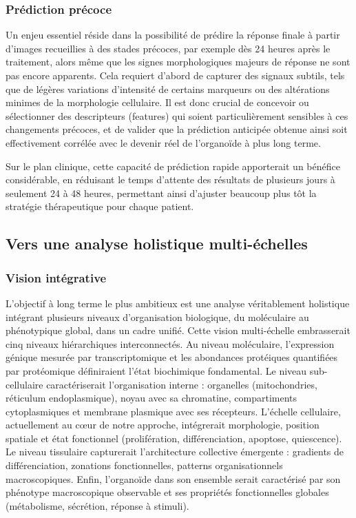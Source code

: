 \subsubsection{Prédiction précoce}

Un enjeu essentiel réside dans la possibilité de prédire la réponse finale à partir d’images recueillies à des stades précoces, par exemple dès 24 heures après le traitement, alors même que les signes morphologiques majeurs de réponse ne sont pas encore apparents. Cela requiert d’abord de capturer des signaux subtils, tels que de légères variations d’intensité de certains marqueurs ou des altérations minimes de la morphologie cellulaire. Il est donc crucial de concevoir ou sélectionner des descripteurs (features) qui soient particulièrement sensibles à ces changements précoces, et de valider que la prédiction anticipée obtenue ainsi soit effectivement corrélée avec le devenir réel de l’organoïde à plus long terme.

Sur le plan clinique, cette capacité de prédiction rapide apporterait un bénéfice considérable, en réduisant le temps d’attente des résultats de plusieurs jours à seulement 24 à 48 heures, permettant ainsi d’ajuster beaucoup plus tôt la stratégie thérapeutique pour chaque patient.


\subsection{Vers une analyse holistique multi-échelles}

\subsubsection{Vision intégrative}

L'objectif à long terme le plus ambitieux est une analyse véritablement holistique intégrant plusieurs niveaux d'organisation biologique, du moléculaire au phénotypique global, dans un cadre unifié. Cette vision multi-échelle embrasserait cinq niveaux hiérarchiques interconnectés. Au niveau moléculaire, l'expression génique mesurée par transcriptomique et les abondances protéiques quantifiées par protéomique définiraient l'état biochimique fondamental. Le niveau sub-cellulaire caractériserait l'organisation interne : organelles (mitochondries, réticulum endoplasmique), noyau avec sa chromatine, compartiments cytoplasmiques et membrane plasmique avec ses récepteurs. L'échelle cellulaire, actuellement au cœur de notre approche, intégrerait morphologie, position spatiale et état fonctionnel (prolifération, différenciation, apoptose, quiescence). Le niveau tissulaire capturerait l'architecture collective émergente : gradients de différenciation, zonations fonctionnelles, patterns organisationnels macroscopiques. Enfin, l'organoïde dans son ensemble serait caractérisé par son phénotype macroscopique observable et ses propriétés fonctionnelles globales (métabolisme, sécrétion, réponse à stimuli).

